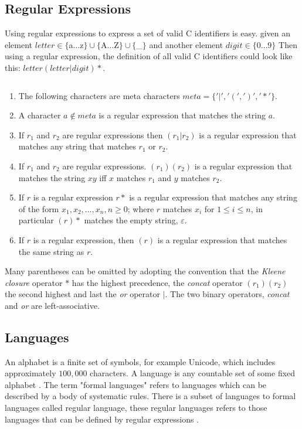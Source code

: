 \subsection{Regular Expressions}
\begin{example}\label{regexpEx}
Using regular expressions to express a set of valid C identifiers is easy.
given an element $letter \in \{$a$ \dots $z$\} \cup \{$A$ \dots $Z$\} \cup 
\{$\_$\}$
and another element $digit \in \{0 \dots 9\}$
Then using a regular expression, the definition of all valid C identifiers 
could look like this: $letter (letter | digit)*$. 
\end{example}
\begin{definition}\label{regexp} $ $\\
\begin{enumerate}
  \item The following characters are meta characters $meta = \{ '|', '(', ')', '*' \}$.
  \item A character $a \notin meta$ is a regular expression that matches the 
      string $a$.
  \item If $r_1$ and $r_2$ are regular expressions then $(r_1 | r_2)$ is a 
      regular expression that matches any string that matches $r_1$ or $r_2$.
  \item If $r_1$ and $r_2$ are regular expressions. $(r_1)(r_2)$ is a regular
      expression that matches the string $xy$ iff $x$ matches $r_1$
      and $y$ matches $r_2$.
  \item If $r$ is a regular expression $r*$ is a regular expression that
      matches any string of the form $x_1, x_2, \dots , x_n, n \geq 0$;
      where $r$ matches $x_i$ for $1 \leq i \leq n$, in particular $(r)*$ 
      matches the empty string, $\varepsilon$.
  \item If $r$ is a regular expression, then $(r)$ is a regular expression that
      matches the same string as $r$.
\end{enumerate}
\end{definition}
Many parentheses can be omitted by adopting the convention that the \emph{Kleene
closure} operator $*$ has the highest precedence, the \emph{concat} operator $(r_1)(r_2)$ the second highest and last the \emph{or}
operator $|$. The two binary operators, \emph{concat} and \emph{or} are
left-associative.
\subsection{Languages}
An alphabet is a finite set of symbols, for example Unicode, which 
includes approximately $100,000$ characters. A language is any 
countable set of some fixed alphabet \cite{Aho2006}.
The term "formal languages" refers to languages which can be described by a body 
of systematic rules. There is a subset of languages to formal languages called 
regular language, these regular languages refers to those languages 
that can be defined by regular expressions \cite{Ranta2012}.
